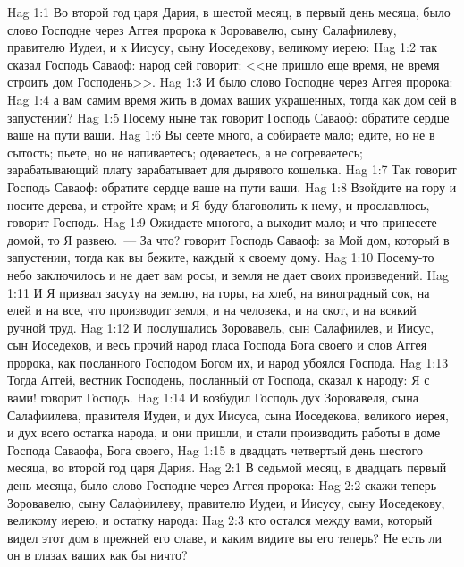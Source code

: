 \vs Hag 1:1 Во второй год царя Дария, в шестой месяц, в первый день месяца, было слово Господне через Аггея пророка к Зоровавелю, сыну Салафиилеву, правителю Иудеи, и к Иисусу, сыну Иоседекову, великому иерею:
\vs Hag 1:2 так сказал Господь Саваоф: народ сей говорит: <<не пришло еще время, не время строить дом Господень>>.
\rsbpar\vs Hag 1:3 И было слово Господне через Аггея пророка:
\vs Hag 1:4 а вам самим время жить в домах ваших украшенных, тогда как дом сей в запустении?
\vs Hag 1:5 Посему ныне так говорит Господь Саваоф: обратите сердце ваше на пути ваши.
\vs Hag 1:6 Вы сеете много, а собираете мало; едите, но не в сытость; пьете, но не напиваетесь; одеваетесь, а не согреваетесь; зарабатывающий плату зарабатывает для дырявого кошелька.
\vs Hag 1:7 Так говорит Господь Саваоф: обратите сердце ваше на пути ваши.
\vs Hag 1:8 Взойдите на гору и носите дерева, и стройте храм; и Я буду благоволить к нему, и прославлюсь, говорит Господь.
\vs Hag 1:9 Ожидаете многого, а выходит мало; и что принесете домой, то Я развею.~--- За что? говорит Господь Саваоф: за Мой дом, который в запустении, тогда как вы бежите, каждый к своему дому.
\vs Hag 1:10 Посему-то небо заключилось и не дает вам росы, и земля не дает своих произведений.
\vs Hag 1:11 И Я призвал засуху на землю, на горы, на хлеб, на виноградный сок, на елей и на все, что производит земля, и на человека, и на скот, и на всякий ручной труд.
\vs Hag 1:12 И послушались Зоровавель, сын Салафиилев, и Иисус, сын Иоседеков, и весь прочий народ гласа Господа Бога своего и слов Аггея пророка, как посланного Господом Богом их, и народ убоялся Господа.
\rsbpar\vs Hag 1:13 Тогда Аггей, вестник Господень, посланный от Господа, сказал к народу: Я с вами! говорит Господь.
\vs Hag 1:14 И возбудил Господь дух Зоровавеля, сына Салафиилева, правителя Иудеи, и дух Иисуса, сына Иоседекова, великого иерея, и дух всего остатка народа, и они пришли, и стали производить работы в доме Господа Саваофа, Бога своего,
\vs Hag 1:15 в двадцать четвертый день шестого месяца, во второй год царя Дария.
\vs Hag 2:1 В седьмой месяц, в двадцать первый день месяца, было слово Господне через Аггея пророка:
\vs Hag 2:2 скажи теперь Зоровавелю, сыну Салафиилеву, правителю Иудеи, и Иисусу, сыну Иоседекову, великому иерею, и остатку народа:
\vs Hag 2:3 кто остался между вами, который видел этот дом в прежней его славе, и каким видите вы его теперь? Не есть ли он в глазах ваших как бы ничто?
